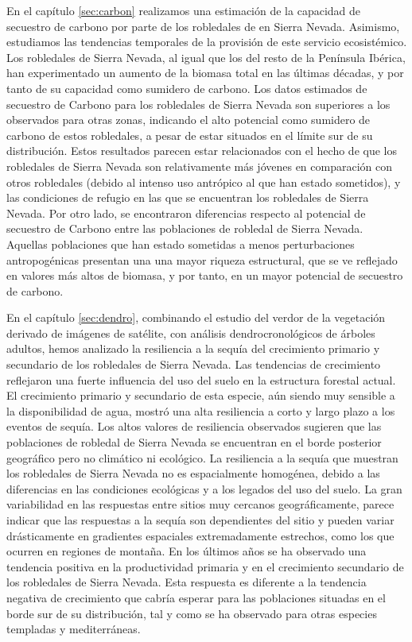 En el \textcolor{ctcolormain}{capítulo \ref{sec:carbon}} realizamos una estimación de la capacidad de secuestro de carbono por parte de los robledales de \Qp en Sierra Nevada. Asimismo, estudiamos las tendencias temporales de la provisión de este servicio ecosistémico. Los robledales de Sierra Nevada, al igual que los del resto de la Península Ibérica, han experimentado un aumento de la biomasa total en las últimas décadas, y por tanto de su capacidad como sumidero de carbono. Los datos estimados de secuestro de Carbono para los robledales de Sierra Nevada son superiores a los observados para otras zonas, indicando el alto potencial como sumidero de carbono de estos robledales, a pesar de estar situados en el límite sur de su distribución. Estos resultados parecen estar relacionados con el hecho de que los robledales de Sierra Nevada son relativamente más jóvenes en comparación con otros robledales (debido al intenso uso antrópico al que han estado sometidos), y las condiciones de refugio en las que se encuentran los robledales de Sierra Nevada. Por otro lado, se encontraron diferencias  respecto al potencial de secuestro de Carbono entre las poblaciones de robledal de Sierra Nevada. Aquellas poblaciones que han estado sometidas a menos perturbaciones antropogénicas presentan una una mayor riqueza estructural, que se ve reflejado en valores más altos de biomasa, y por tanto, en un mayor potencial de secuestro de carbono. 

En el \textcolor{ctcolormain}{capítulo \ref{sec:dendro}}, combinando el estudio del verdor de la vegetación derivado de imágenes de satélite, con análisis dendrocronológicos de árboles adultos, hemos analizado la resiliencia a la sequía del crecimiento primario y secundario de los robledales de Sierra Nevada. Las tendencias de crecimiento reflejaron una fuerte influencia del uso del suelo en la estructura forestal actual. El crecimiento primario y secundario de esta especie, aún siendo muy sensible a la disponibilidad de agua, mostró una alta resiliencia a corto y largo plazo a los eventos de sequía. Los altos valores de resiliencia observados sugieren que las poblaciones de robledal de Sierra Nevada se encuentran en el borde posterior geográfico pero no climático ni ecológico. La resiliencia a la sequía que muestran los robledales de Sierra Nevada no es espacialmente homogénea, debido a las diferencias en las condiciones ecológicas y a los legados del uso del suelo. La gran variabilidad en las respuestas entre sitios muy cercanos geográficamente, parece indicar que las respuestas a la sequía son dependientes del sitio y pueden variar drásticamente en gradientes espaciales extremadamente estrechos, como los que ocurren en regiones de montaña. En los últimos años se ha observado una tendencia positiva en la productividad primaria y en el crecimiento secundario de los robledales de Sierra Nevada. Esta respuesta es diferente a la tendencia negativa de crecimiento que cabría esperar para las poblaciones situadas en el borde sur de su distribución, tal y como se ha observado para otras especies templadas y mediterráneas. 

